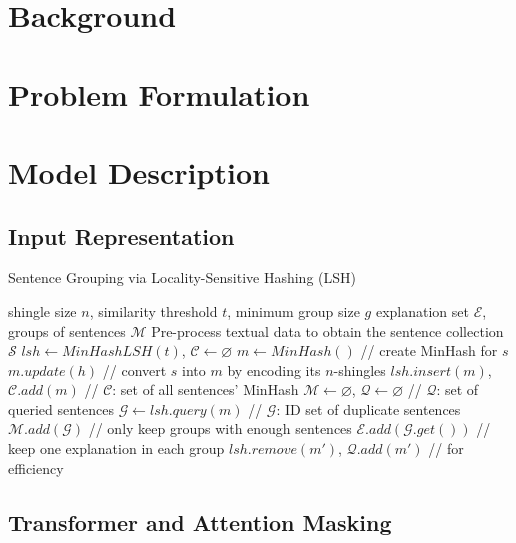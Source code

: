 \section{Background}

\section{Problem Formulation} \label{sec3:problem}


\section{Model Description}


\subsection{Input Representation}

\begin{algorithm}
	\caption{Sentence Grouping via Locality-Sensitive Hashing (LSH)}
	\label{alg3:lsh}
	\begin{algorithmic}[1]
		\REQUIRE shingle size $n$, similarity threshold $t$, minimum group size $g$
		\ENSURE explanation set $\mathcal{E}$, groups of sentences $\mathcal{M}$
		\STATE Pre-process textual data to obtain the sentence collection $\mathcal{S}$
		\STATE $lsh \gets MinHashLSH(t)$, $\mathcal{C} \gets \varnothing$
		\STATE $m \gets MinHash()$  // create MinHash for $s$
		\STATE $m.update(h)$  // convert $s$ into $m$ by encoding its $n$-shingles
		\ENDFOR
		\STATE $lsh.insert(m)$, $\mathcal{C}.add(m)$  // $\mathcal{C}$: set of all sentences' MinHash
		\ENDFOR
		\STATE $\mathcal{M} \gets \varnothing$, $\mathcal{Q} \gets \varnothing$  // $\mathcal{Q}$: set of queried sentences
		\STATE $\mathcal{G} \gets lsh.query(m)$  // $\mathcal{G}$: ID set of duplicate sentences
		\STATE $\mathcal{M}.add(\mathcal{G})$  // only keep groups with enough sentences
		\STATE $\mathcal{E}.add(\mathcal{G}.get())$  // keep one explanation in each group
		\ENDIF
		\STATE $lsh.remove(m')$, $\mathcal{Q}.add(m')$  // for efficiency
		\ENDFOR
		\ENDIF
		\ENDFOR
	\end{algorithmic}
\end{algorithm}

\subsection{Transformer and Attention Masking}




